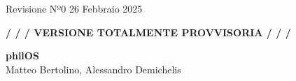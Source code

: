 \documentclass[a4paper,12pt]{article}
\begin{document}
\thispagestyle{empty} %
\footnotesize
Revisione Nº0
\hfill
26 Febbraio 2025
\normalsize

\begin{center}
\textbf{ / / / VERSIONE TOTALMENTE PROVVISORIA / / /}
\end{center}

\vspace*{\fill}
\begin{center}
\Large{\textbf{philOS}}
\vspace{0.1cm}
\normalsize
\\ Matteo Bertolino, Alessandro Demichelis \\
\vspace*{\fill}
\vspace{0.5cm}
\medskip
\normalsize
\end{center}

\pagebreak

\renewcommand{\contentsname}{Contenuti}
\tableofcontents
\bigskip

\pagebreak










\renewcommand{\refname}{Riferimenti}
\printbibliography
\bigskip
\end{document}
